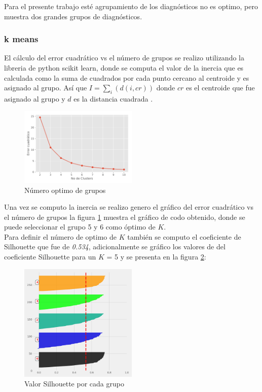 Para el presente trabajo esté agrupamiento de los diagnósticos no es optimo, pero muestra dos grandes grupos de diagnósticos. 

\subsubsection{k means}

El cálculo del error cuadrático vs el número de grupos se realizo utilizando la libreria de python scikit learn, donde se computa el valor de la inercia que es calculada como la suma de cuadrados por cada punto cercano al centroide y es asignado al grupo. Así que  $I = \sum_{i}(d(i,cr))$ donde $cr$ es el centroide que fue asignado al grupo y $d$ es la distancia cuadrada \cite{scikit-learn}. 

\begin{figure}[H] 
	\centering
	\includegraphics[width=0.5\textwidth]{Kap4/Clusters}
	\caption{Número optimo de grupos} 
	\label{fig:Clusters}
\end{figure}

Una vez se computo la inercia se realizo genero el gráfico del error cuadrático vs el número de grupos  la figura \ref{fig:Clusters} muestra el gráfico de codo obtenido, donde se puede seleccionar el grupo 5 y 6 como óptimo de $K$.\\

Para definir el número de optimo de $K$ también se computo el coeficiente de Silhouette  que fue de \textit{0.534}, adicionalmente se gráfico los valores de del coeficiente Silhouette para un $K$ = 5 y se presenta en la figura \ref{fig:S}:

\begin{figure}[H] 
	\centering
	\includegraphics[width=0.5\textwidth]{Kap4/S}
	\caption{Valor Silhouette por cada grupo} 
	\label{fig:S}
\end{figure}

